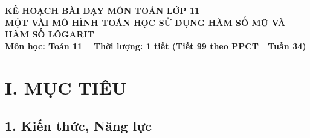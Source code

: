 \documentclass[12pt, a4paper]{article}
\begin{document}
\begin{center}
    {\fontsize{14pt}{17pt}\selectfont \textbf{KẾ HOẠCH BÀI DẠY MÔN TOÁN LỚP 11}}\\[6pt]
    {\fontsize{16pt}{19pt}\selectfont \textbf{MỘT VÀI MÔ HÌNH TOÁN HỌC SỬ DỤNG HÀM SỐ MŨ VÀ HÀM SỐ LÔGARIT}}\\[4pt]
    {\fontsize{12pt}{15pt}\selectfont \textbf{Môn học: Toán 11} \ \textbar \ \textbf{Thời lượng: 1 tiết (Tiết 99 theo PPCT | Tuần 34)}}
\end{center}

\vspace{5pt}

\section*{I. MỤC TIÊU}

\subsection*{1. Kiến thức, Năng lực}
\end{document}
